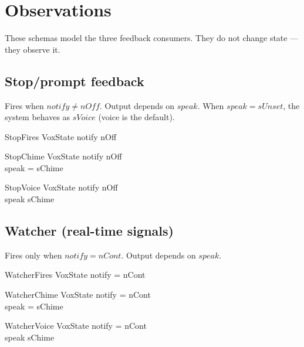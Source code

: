 \documentclass[a4paper,10pt,fleqn]{article}
\begin{document}
\section{Observations}

These schemas model the three feedback consumers. They do not
change state --- they observe it.

\subsection{Stop/prompt feedback}

Fires when $notify \neq nOff$. Output depends on $speak$.
When $speak = sUnset$, the system behaves as $sVoice$
(voice is the default).

\begin{schema}{StopFires}
  \Xi VoxState
  \where
  notify \neq nOff
\end{schema}

\begin{schema}{StopChime}
  \Xi VoxState
  \where
  notify \neq nOff \\
  speak = sChime
\end{schema}

\begin{schema}{StopVoice}
  \Xi VoxState
  \where
  notify \neq nOff \\
  speak \neq sChime
\end{schema}

\subsection{Watcher (real-time signals)}

Fires only when $notify = nCont$. Output depends on $speak$.

\begin{schema}{WatcherFires}
  \Xi VoxState
  \where
  notify = nCont
\end{schema}

\begin{schema}{WatcherChime}
  \Xi VoxState
  \where
  notify = nCont \\
  speak = sChime
\end{schema}

\begin{schema}{WatcherVoice}
  \Xi VoxState
  \where
  notify = nCont \\
  speak \neq sChime
\end{schema}
\end{document}
